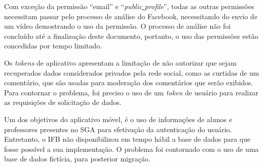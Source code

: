 Com exceção da permissão ``email'' e ``\textit{public\underline{{ }}profile}'', todas as outras permissões necessitam passar pelo processo de análise do Facebook, necessitando do envio de um vídeo demostrando o uso da permissão. O processo de análise não foi concluído até a finalização deste documento, portanto, o uso das permissões estão concedidas por tempo limitado.

Os \textit{tokens} de aplicativo apresentam a limitação de não autorizar que sejam recuperados dados considerados privados pela rede social, como as curtidas de um comentário, que são usadas para moderação dos comentários que serão exibidos. Para contornar o problema, foi preciso o uso de um \textit{token} de usuário para realizar as requisições de solicitação de dados.

Um dos objetivos do aplicativo móvel, é o uso de informações de alunos e professores presentes no SGA para efetivação da autenticação do usuário. Entretanto, o IFB não disponibilizou em tempo hábil a base de dados para que fosse possível a sua implementação. O problema foi contornado com o uso de uma base de dados fictícia, para posterior migração.